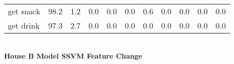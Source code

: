 \documentclass{article}
\begin{document}
\begin{sideways}
\begin{tabular}{lrrrrrrrrrr}
get snack         &        98.2 &                1.2 &               0.0 &                0.0 &                0.0 &              0.6 &                      0.0 &                   0.0 &              0.0 &              0.0 \\
get drink         &        97.3 &                2.7 &               0.0 &                0.0 &                0.0 &              0.0 &                      0.0 &                   0.0 &              0.0 &              0.0 \\
\bottomrule
\end{tabular}
\end{sideways}
\normalsize
\vspace{1cm}\\
\textbf{House B Model SSVM Feature Change}\\
\vspace{1cm}\\
\end{document}
